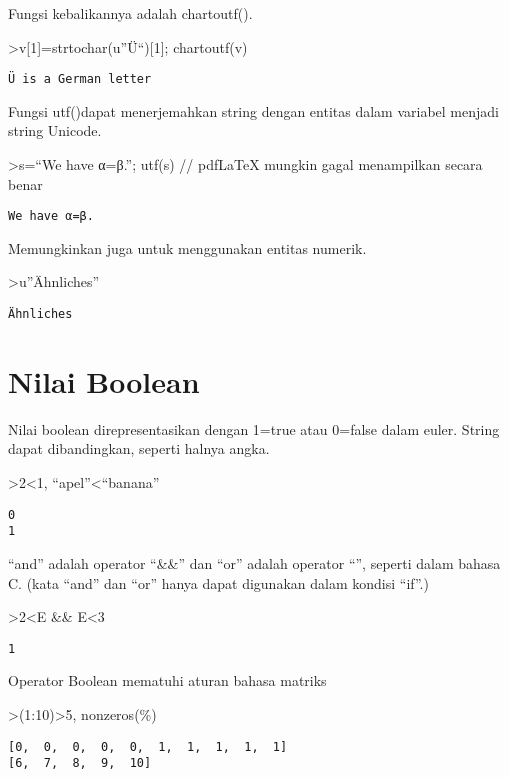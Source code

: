 \documentclass[
]{book}
\begin{document}
Fungsi kebalikannya adalah chartoutf().

\textgreater v{[}1{]}=strtochar(u''Ü``){[}1{]}; chartoutf(v)

\begin{verbatim}
Ü is a German letter
\end{verbatim}

Fungsi utf()dapat menerjemahkan string dengan entitas dalam variabel menjadi string Unicode.

\textgreater s=``We have α=β.''; utf(s) // pdfLaTeX mungkin gagal menampilkan secara benar

\begin{verbatim}
We have α=β.
\end{verbatim}

Memungkinkan juga untuk menggunakan entitas numerik.

\textgreater u''Ähnliches''

\begin{verbatim}
Ähnliches
\end{verbatim}

\section{Nilai Boolean}\label{nilai-boolean}

Nilai boolean direpresentasikan dengan 1=true atau 0=false dalam euler. String dapat dibandingkan, seperti halnya angka.

\textgreater2\textless1, ``apel''\textless{}``banana''

\begin{verbatim}
0
1
\end{verbatim}

``and'' adalah operator ``\&\&'' dan ``or'' adalah operator ``\textbar\textbar{}'', seperti dalam bahasa C. (kata ``and'' dan ``or'' hanya dapat digunakan dalam kondisi ``if''.)

\textgreater2\textless E \&\& E\textless3

\begin{verbatim}
1
\end{verbatim}

Operator Boolean mematuhi aturan bahasa matriks

\textgreater(1:10)\textgreater5, nonzeros(\%)

\begin{verbatim}
[0,  0,  0,  0,  0,  1,  1,  1,  1,  1]
[6,  7,  8,  9,  10]
\end{verbatim}
\end{document}
